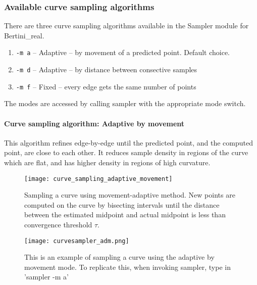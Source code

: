  	\subsubsection{Available curve sampling algorithms}
 	

 	There are three curve sampling algorithms available in the Sampler module for Bertini\_real.

 	\begin{enumerate}

 		\item {\tt -m a} -- Adaptive -- by movement of a predicted point.  Default choice.

 		\item {\tt -m d} -- Adaptive -- by distance between consective samples

 		\item {\tt -m f} -- Fixed -- every edge gets the same number of points

 	\end{enumerate}

The modes are accessed by calling sampler with the appropriate mode switch.


\paragraph{Curve sampling algorithm: Adaptive by movement}

This algorithm refines edge-by-edge until the predicted point, and the computed point, are close to each other.  It reduces sample density in regions of the curve which are flat, and has higher density in regions of high curvature.


\begin{figure}[H]
\begin{center}
\texttt{[image: curve\_sampling\_adaptive\_movement]}
\caption[Adaptive-movement curve sampling]{Sampling a curve using movement-adaptive method.  New points are computed on the curve by bisecting intervals until the distance between the estimated midpoint and actual midpoint is less than convergence threshold $\tau$.}
\end{center}
\end{figure}
 
\begin{figure}[H]
\centering
\texttt{[image: curvesampler\_adm.png]}
\caption{This is an example of sampling a curve using the adaptive by movement mode. To replicate this, when invoking sampler, type in 'sampler -m a'}
\end{figure}

